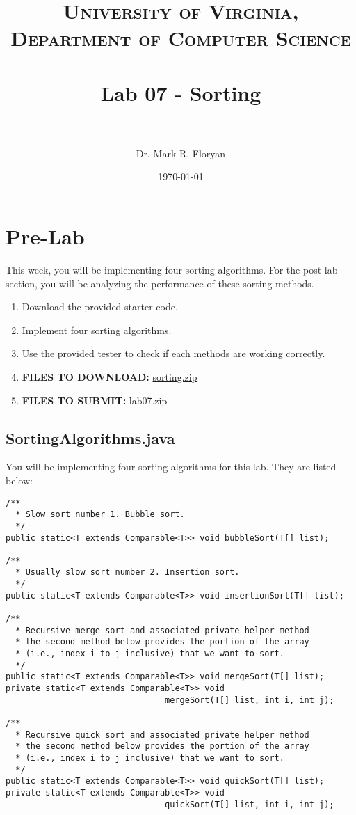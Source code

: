\documentclass[paper=a4, fontsize=11pt, parskip=full]{scrartcl} %
\title{
\normalfont \normalsize
\textsc{University of Virginia, Department of Computer Science} \\ [25pt] %
\horrule{0.5pt} \\[0.4cm] %
\huge Lab 07 - Sorting \\ %
\horrule{2pt} \\[0.5cm] %
}
\author{Dr. Mark R. Floryan} %
\date{\normalsize\today} %
\numberwithin{equation}{section} %
\numberwithin{figure}{section} %
\numberwithin{table}{section} %
\begin{document}
\maketitle %


\section{Pre-Lab}

This week, you will be implementing four sorting algorithms. For the post-lab section, you will be analyzing the performance of these sorting methods.

\begin{enumerate}
	\item Download the provided starter code.
	\item Implement four sorting algorithms.
	\item Use the provided tester to check if each methods are working correctly.
	\item \textbf{FILES TO DOWNLOAD:} \href{https://markfloryan.github.io/dsa1/labs/lab07%20-%20Sorting/code/sorting.zip}{sorting.zip}
	\item \textbf{FILES TO SUBMIT:} lab07.zip
\end{enumerate}


\subsection{SortingAlgorithms.java}

You will be implementing four sorting algorithms for this lab. They are listed below:

\begin{lstlisting}
/**
  * Slow sort number 1. Bubble sort.
  */
public static<T extends Comparable<T>> void bubbleSort(T[] list);
	
/**
  * Usually slow sort number 2. Insertion sort.
  */
public static<T extends Comparable<T>> void insertionSort(T[] list);
	
/**
  * Recursive merge sort and associated private helper method
  * the second method below provides the portion of the array
  * (i.e., index i to j inclusive) that we want to sort.
  */
public static<T extends Comparable<T>> void mergeSort(T[] list);
private static<T extends Comparable<T>> void
								mergeSort(T[] list, int i, int j);

/**
  * Recursive quick sort and associated private helper method
  * the second method below provides the portion of the array
  * (i.e., index i to j inclusive) that we want to sort.
  */
public static<T extends Comparable<T>> void quickSort(T[] list);
private static<T extends Comparable<T>> void
								quickSort(T[] list, int i, int j);
\end{lstlisting}
\end{document}
